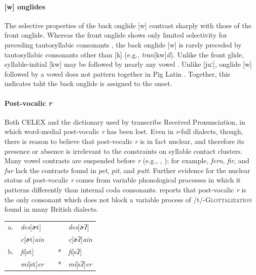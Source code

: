 \paragraph{[w] onglides} The selective properties of the back onglide [w] contrast sharply with those of the front onglide. Whereas the front onglide shows only limited selectivity for preceding tautosyllabic consonants \citep{Davis1995,Kaye1996}, the back onglide [w] is rarely preceded by tautosyllabic consonants other than [k] (e.g., \emph{tran}[kw]\emph{il}). Unlike the front glide, syllable-initial [kw] may be followed by nearly any vowel \citep[][161]{Davis1995}. Unlike [juː], onglide [w] followed by a vowel does not pattern together in Pig Latin \citep[][166]{Davis1995}. Together, this indicates taht the back onglide is assigned to the onset.

\paragraph{Post-vocalic \emph{r}} Both CELEX and the dictionary used by \citet{Pierrehumbert1994} transcribe Received Pronunciation, in which word-medial post-vocalic \emph{r} has been lost. Even in \emph{r}-full dialects, though, there is reason to believe that post-vocalic \emph{r} is in fact nuclear, and therefore its presence or absence is irrelevant to the constraints on syllable contact clusters. Many vowel contrasts are suspended before \emph{r} (e.g., \citealt[269f.]{Fudge1969}, \citealt[][255]{Harris1994}); for example, \emph{fern}, \emph{fir}, and \emph{fur} lack the contrasts found in \emph{pet}, \emph{pit}, and \emph{putt}. Further evidence for the nuclear status of post-vocalic \emph{r} comes from variable phonological processes in which it patterns differently than internal coda consonants. \citet[258]{Harris1994} reports that post-vocalic \emph{r} is the only consonant which does not block a variable process of /t/-\textsc{Glottalization} found in many British dialects.

\begin{example}
\begin{tabular}{l l l l@{} l}
a. & \emph{des}[ɚt]         & \alt{} &   & \emph{des}[ɚʔ]         \\
   & \emph{c}[ɚt]\emph{ain} & \alt{} &   & \emph{c}[ɚʔ]\emph{ain} \\
b. & \emph{fi}[st]          & \alt{} & * & \emph{fi}[sʔ]          \\
   & \emph{mi}[st]\emph{er} & \alt{} & * & \emph{mi}[sʔ]\emph{er} \\
\end{tabular}
\end{example}

